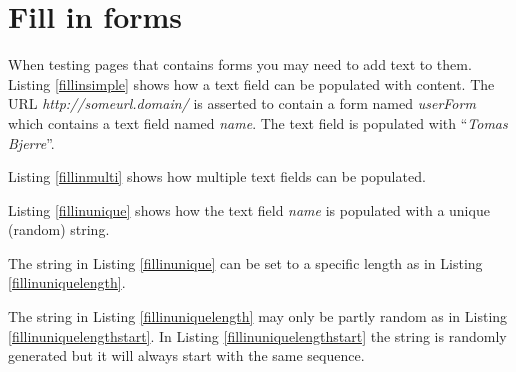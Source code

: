 \documentclass[a4paper,11pt]{kth-mag}
\begin{document}
\section{Fill in forms}
When testing pages that contains forms you may need to add text to them. Listing \ref{fillinsimple} shows how a text field can be populated with content. The URL \textit{http://someurl.domain/} is asserted to contain a form named \textit{userForm} which contains a text field named \textit{name}. The text field is populated with ``\textit{Tomas Bjerre}''.

\lstset{basicstyle=\footnotesize, caption=Fill in text field in formular, label=fillinsimple, numbers=left, frame=single, captionpos=b, breaklines=true}


Listing \ref{fillinmulti} shows how multiple text fields can be populated.

\lstset{basicstyle=\footnotesize, caption=Fill in multiple text fields in formular, label=fillinmulti, numbers=left, frame=single, captionpos=b, breaklines=true}


Listing \ref{fillinunique} shows how the text field \textit{name} is populated with a unique (random) string.

\lstset{basicstyle=\footnotesize, caption=Fill in text field in formular with unique string, label=fillinunique, numbers=left, frame=single, captionpos=b, breaklines=true}


The string in Listing \ref{fillinunique} can be set to a specific length as in Listing \ref{fillinuniquelength}.

\lstset{basicstyle=\footnotesize, caption=Fill in text field in formular with unique string of specific length, label=fillinuniquelength, numbers=left, frame=single, captionpos=b, breaklines=true}


The string in Listing \ref{fillinuniquelength} may only be partly random as in Listing \ref{fillinuniquelengthstart}. In Listing \ref{fillinuniquelengthstart} the string is randomly generated but it will always start with the same sequence.
\end{document}
